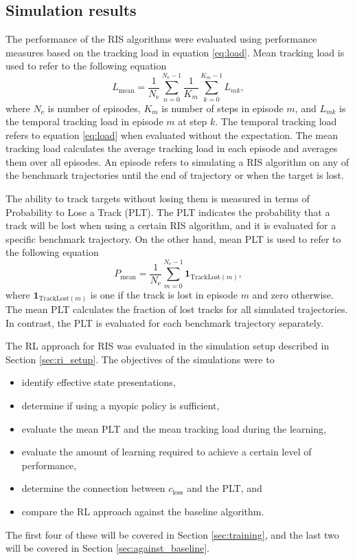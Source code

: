 \documentclass[english, 12pt, a4paper, elec, utf8, a-1b, online]{aaltothesis}
\newcommand{\Ne}{N_\text{e}}
\renewcommand{\vec}[1]{\mathbf{#1}}
\newcommand{\closs}{c_\text{loss}}
\begin{document}
\subsection{Simulation results}\label{sec:ri_sim}

The performance of the RIS algorithms were evaluated using performance measures based on the tracking load in equation \eqref{eq:load}.
Mean tracking load is used to refer to the following equation
\begin{equation}\label{eq:criterion_load}
    L_\text{mean} = \frac{1}{\Ne} \sum_{n=0}^{\Ne-1} \frac{1}{K_m}\sum_{k=0}^{K_m-1} L_{mk},
\end{equation}
where $\Ne$ is number of episodes, $K_m$ is number of steps in episode $m$, and $L_{mk}$ is the temporal tracking load in episode $m$ at step $k$.
The temporal tracking load refers to equation \ref{eq:load} when evaluated without
the expectation.
The mean tracking load calculates the average tracking load in each episode and averages them over all episodes.  
An episode refers to simulating a RIS algorithm on any of the benchmark trajectories until the end of trajectory or when the target is lost.

The ability to track targets without losing them is measured in terms of Probability to Lose a Track (PLT).
The PLT indicates the probability that a track will be lost when using a certain RIS algorithm, and it is evaluated for a specific benchmark trajectory.
On the other hand, mean PLT is used to refer to the following equation
\begin{equation}\label{eq:criterion_lost}
    P_\text{mean} = \frac{1}{\Ne} \sum_{m=0}^{\Ne-1} \vec{1}_{\text{TrackLost}(m)},
\end{equation}
where $\vec{1}_{\text{TrackLost}(m)}$ is one if the track is lost in episode $m$ and zero otherwise.
The mean PLT calculates the fraction of lost tracks for all simulated trajectories.
In contrast, the PLT is evaluated for each benchmark trajectory separately.

The RL approach for RIS was evaluated in the simulation setup described in Section \ref{sec:ri_setup}.
The objectives of the simulations were to
\begin{itemize}
    \item identify effective state presentations,
    \item determine if using a myopic policy is sufficient,
    \item evaluate the mean PLT and the mean tracking load during the learning,
    \item evaluate the amount of learning required to achieve a certain level of performance,
    \item determine the connection between $\closs$ and the PLT, and
    \item compare the RL approach against the baseline algorithm.
\end{itemize}
The first four of these will be covered in Section \ref{sec:training}, and the last two will be covered in Section \ref{sec:against_baseline}.
\end{document}

